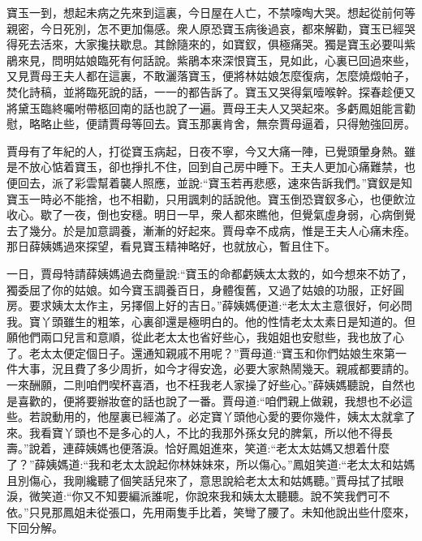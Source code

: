 \begin{parag}
    寶玉一到，想起未病之先來到這裏，今日屋在人亡，不禁嚎啕大哭。想起從前何等親密，今日死別，怎不更加傷感。衆人原恐寶玉病後過哀，都來解勸，寶玉已經哭得死去活來，大家攙扶歇息。其餘隨來的，如寶釵，俱極痛哭。獨是寶玉必要叫紫鵑來見，問明姑娘臨死有何話說。紫鵑本來深恨寶玉，見如此，心裏已回過來些，又見賈母王夫人都在這裏，不敢灑落寶玉，便將林姑娘怎麼復病，怎麼燒燬帕子，焚化詩稿，並將臨死說的話，一一的都告訴了。寶玉又哭得氣噎喉幹。探春趁便又將黛玉臨終囑咐帶柩回南的話也說了一遍。賈母王夫人又哭起來。多虧鳳姐能言勸慰，略略止些，便請賈母等回去。寶玉那裏肯舍，無奈賈母逼着，只得勉強回房。
\end{parag}


\begin{parag}
    賈母有了年紀的人，打從寶玉病起，日夜不寧，今又大痛一陣，已覺頭暈身熱。雖是不放心惦着寶玉，卻也掙扎不住，回到自己房中睡下。王夫人更加心痛難禁，也便回去，派了彩雲幫着襲人照應，並說:“寶玉若再悲慼，速來告訴我們。”寶釵是知寶玉一時必不能捨，也不相勸，只用諷刺的話說他。寶玉倒恐寶釵多心，也便飲泣收心。歇了一夜，倒也安穩。明日一早，衆人都來瞧他，但覺氣虛身弱，心病倒覺去了幾分。於是加意調養，漸漸的好起來。賈母幸不成病，惟是王夫人心痛未痊。那日薛姨媽過來探望，看見寶玉精神略好，也就放心，暫且住下。
\end{parag}


\begin{parag}
    一日，賈母特請薛姨媽過去商量說:“寶玉的命都虧姨太太救的，如今想來不妨了，獨委屈了你的姑娘。如今寶玉調養百日，身體復舊，又過了姑娘的功服，正好圓房。要求姨太太作主，另擇個上好的吉日。”薛姨媽便道:“老太太主意很好，何必問我。寶丫頭雖生的粗笨，心裏卻還是極明白的。他的性情老太太素日是知道的。但願他們兩口兒言和意順，從此老太太也省好些心，我姐姐也安慰些，我也放了心了。老太太便定個日子。還通知親戚不用呢？”賈母道:“寶玉和你們姑娘生來第一件大事，況且費了多少周折，如今才得安逸，必要大家熱鬧幾天。親戚都要請的。一來酬願，二則咱們喫杯喜酒，也不枉我老人家操了好些心。”薛姨媽聽說，自然也是喜歡的，便將要辦妝奩的話也說了一番。賈母道:“咱們親上做親，我想也不必這些。若說動用的，他屋裏已經滿了。必定寶丫頭他心愛的要你幾件，姨太太就拿了來。我看寶丫頭也不是多心的人，不比的我那外孫女兒的脾氣，所以他不得長壽。”說着，連薛姨媽也便落淚。恰好鳳姐進來，笑道:“老太太姑媽又想着什麼了？”薛姨媽道:“我和老太太說起你林妹妹來，所以傷心。”鳳姐笑道:“老太太和姑媽且別傷心，我剛纔聽了個笑話兒來了，意思說給老太太和姑媽聽。”賈母拭了拭眼淚，微笑道:“你又不知要編派誰呢，你說來我和姨太太聽聽。說不笑我們可不依。”只見那鳳姐未從張口，先用兩隻手比着，笑彎了腰了。未知他說出些什麼來，下回分解。
\end{parag}